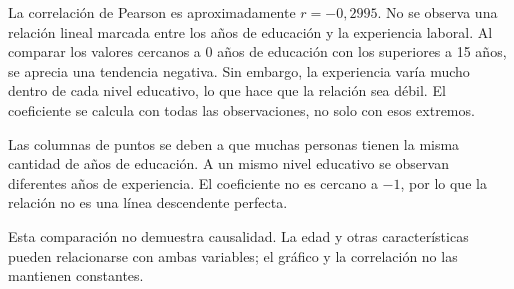 \documentclass{article}
\begin{document}
La correlación de Pearson es aproximadamente \textbf{$r=-0{,}2995$}. No se observa una relación lineal marcada entre los años de educación y la experiencia laboral. Al comparar los valores cercanos a 0 años de educación con los superiores a 15 años, se aprecia una tendencia negativa. Sin embargo, la experiencia varía mucho dentro de cada nivel educativo, lo que hace que la relación sea débil. El coeficiente se calcula con todas las observaciones, no solo con esos extremos.

Las columnas de puntos se deben a que muchas personas tienen la misma cantidad de años de educación. A un mismo nivel educativo se observan diferentes años de experiencia. El coeficiente no es cercano a $-1$, por lo que la relación no es una línea descendente perfecta.

Esta comparación no demuestra causalidad. La edad y otras características pueden relacionarse con ambas variables; el gráfico y la correlación no las mantienen constantes.
\end{document}
